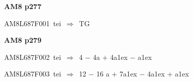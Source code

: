 \par\vfill\eject
{\bf\hfill AM8 p277\hfill\hbox{}}\par\bigskip
{\sixrm AM8L687F001\ {\sixit tei}\ }$\Rightarrow$\ TG\par\smallskip

\par\vfill\eject
{\bf\hfill AM8 p279\hfill\hbox{}}\par\bigskip
{\sixrm AM8L687F002\ {\sixit tei}\ }$\Rightarrow$\ 4 − 4{\tenit a} + 4{\tenit a}\raise1ex\hbox{} − {\tenit a}\raise1ex\hbox{}\par\smallskip
{\sixrm AM8L687F003\ {\sixit tei}\ }$\Rightarrow$\ 12 − 16 {\tenit a} + 7{\tenit a}\raise1ex\hbox{} − 4{\tenit a}\raise1ex\hbox{} + {\tenit a}\raise1ex\hbox{}\par\smallskip

